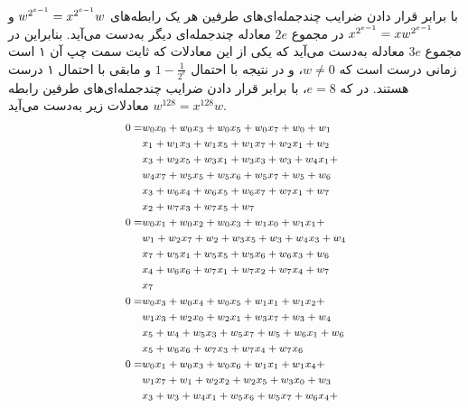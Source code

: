 با برابر قرار دادن ضرایب چندجمله‌ای‌های طرفین هر یک  رابطه‌های 
${\small w^{2^{e-1}} = x^{2^{e-1}}w}$
و 
${\small x^{2^{e-1}} = xw^{2^{e-1}}}$
 در مجموع 
$2e$
 معادله چندجمله‌ای دیگر به‌دست می‌آید. بنابراین در مجموع 
 $3e$
 معادله  به‌دست می‌آید که یکی از این معادلات که ثابت سمت چپ آن ۱ است  زمانی درست است که 
$w \neq 0$، 
و در نتیجه با احتمال 
$1 - \frac{1}{2^{e}}$
و مابقی با احتمال ۱ درست هستند.  در 
{\small {}}
که 
{\small $e = 8$}،
 با برابر قرار دادن ضرایب چندجمله‌ای‌های طرفین رابطه 
$w^{128} = x^{128}w$
معادلات زیر به‌دست می‌آید. 
\begingroup
\allowdisplaybreaks
\begin{equation*}
{\footnotesize \begin{split}
	0 =& w_{0} x_{0} + w_{0} x_{3} + w_{0} x_{5} + w_{0} x_{7} + w_{0} + w_{1}\\
	&x_{1} + w_{1} x_{3} + w_{1} x_{5} + w_{1} x_{7} + w_{2} x_{1} + w_{2}\\
	&x_{3} + w_{2} x_{5} + w_{3} x_{1} + w_{3} x_{3} + w_{3} + w_{4} x_{1} +\\
	&w_{4} x_{7} + w_{5} x_{5} + w_{5} x_{6} + w_{5} x_{7} + w_{5} + w_{6}\\
	&x_{3} + w_{6} x_{4} + w_{6} x_{5} + w_{6} x_{7} + w_{7} x_{1} + w_{7}\\
	&x_{2} + w_{7} x_{3} + w_{7} x_{5} + w_{7}\\
	0 =& w_{0} x_{1} + w_{0} x_{2} + w_{0} x_{3} + w_{1} x_{0} + w_{1} x_{1} +\\
	&w_{1} + w_{2} x_{7} + w_{2} + w_{3} x_{5} + w_{3} + w_{4} x_{3} + w_{4}\\
	&x_{7} + w_{5} x_{1} + w_{5} x_{5} + w_{5} x_{6} + w_{6} x_{3} + w_{6}\\
	&x_{4} + w_{6} x_{6} + w_{7} x_{1} + w_{7} x_{2} + w_{7} x_{4} + w_{7}\\
	&x_{7}\\
	0 =& w_{0} x_{3} + w_{0} x_{4} + w_{0} x_{5} + w_{1} x_{1} + w_{1} x_{2} +\\
	&w_{1} x_{3} + w_{2} x_{0} + w_{2} x_{1} + w_{3} x_{7} + w_{3} + w_{4}\\
	&x_{5} + w_{4} + w_{5} x_{3} + w_{5} x_{7} + w_{5} + w_{6} x_{1} + w_{6}\\
	&x_{5} + w_{6} x_{6} + w_{7} x_{3} + w_{7} x_{4} + w_{7} x_{6}\\
	0 =& w_{0} x_{1} + w_{0} x_{3} + w_{0} x_{6} + w_{1} x_{1} + w_{1} x_{4} +\\
	&w_{1} x_{7} + w_{1} + w_{2} x_{2} + w_{2} x_{5} + w_{3} x_{0} + w_{3}\\
	&x_{3} + w_{3} + w_{4} x_{1} + w_{5} x_{6} + w_{5} x_{7} + w_{6} x_{4} +\\

\end{split}}
\end{equation*}
